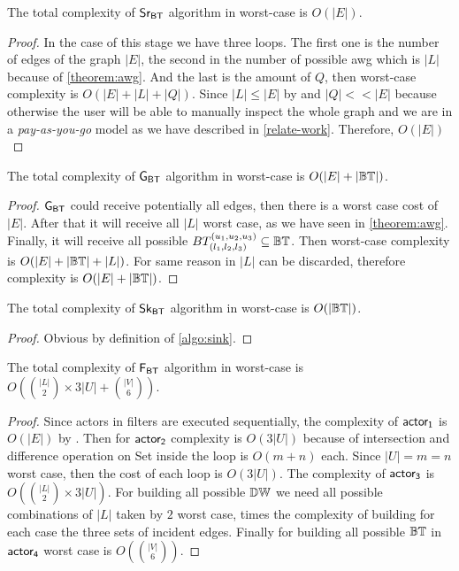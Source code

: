 \begin{proposition}\label{prop:comp-src}
The total complexity of $\mathsf{Sr_{BT}}$ algorithm in worst-case is $O(|E|)$.
\end{proposition}
\begin{proof}
In the case of this stage we have three loops. The first one is the number of edges of the graph $|E|$, the second in the number 
of possible \acrshort{awg} which is $|L|$ because of \autoref{theorem:awg}.
And the last is the amount of $Q$, then worst-case complexity is $O(|E| + |L| + |Q|)$.
Since $|L| \leq |E|$ by  and $|Q| << |E|$ because otherwise the user will be able to manually inspect the whole graph and we are in a \emph{pay-as-you-go} model
as we have described in \autoref{relate-work}.
Therefore, $O(|E|)$ 
\end{proof}

\begin{proposition}
The total complexity of $\mathsf{G_{BT}}$ algorithm in worst-case is $O(|E| + |\mathbb{BT}|)$.
\end{proposition}
\begin{proof}
$\mathsf{G_{BT}}$ could receive potentially all edges, then there is a worst case cost of $|E|$.
After that it will receive all $|L|$ worst case, as we have seen in \autoref{theorem:awg}.
Finally, it will receive all possible $BT_{(l_1, l_2,l_3)}^{(u_1, u_2, u_3)} \subseteq \mathbb{BT}$. Then worst-case complexity is $O(|E| + |\mathbb{BT}| + |L|)$.
For same reason in  $|L|$ can be discarded, therefore complexity is $O(|E| + |\mathbb{BT}|)$.
\end{proof}

\begin{proposition}
The total complexity of $\mathsf{Sk_{BT}}$ algorithm in worst-case is $O(|\mathbb{BT}|)$.
\end{proposition}
\begin{proof}
Obvious by definition of \autoref{algo:sink}.
\end{proof}

\begin{proposition}
The total complexity of $\mathsf{F_{BT}}$ algorithm in worst-case is $O(\binom{|L|}{2} \times 3|U| + \binom{|V|}{6})$.
\end{proposition}
\begin{proof}
Since actors in filters are executed sequentially, the complexity of $\mathsf{actor_1}$ is $O(|E|)$ by .
Then for $\mathsf{actor_2}$ complexity is $O(3|U|)$ because of intersection and difference operation on Set inside the loop is $O(m+n)$ each. 
Since $|U| = m = n$ worst case, then the cost of each loop is $O(3|U|)$.  
The complexity of $\mathsf{actor_3}$ is $O(\binom{|L|}{2} \times 3|U|)$. For building all possible $\mathbb{DW}$ we need all possible combinations of $|L|$ taken by $2$ worst case, times the complexity of building for each case the three sets of incident edges.
Finally for building all possible $\mathbb{BT}$ in $\mathsf{actor_4}$ worst case is $O(\binom{|V|}{6})$.
\end{proof}
      
